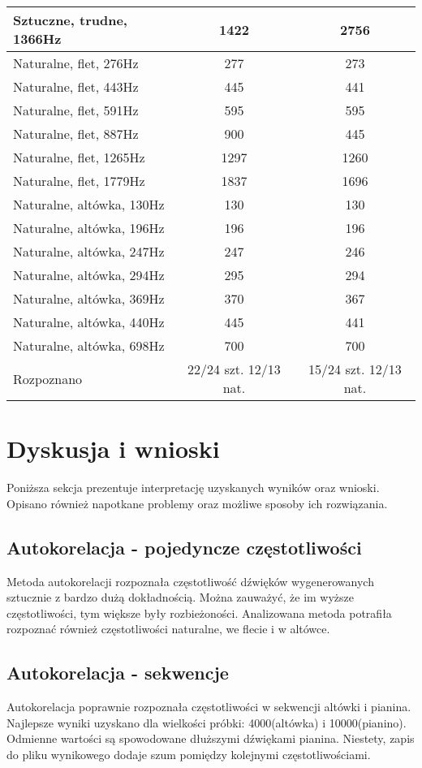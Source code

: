 \documentclass{classrep}
\begin{document}
\begin{tabular}{ l | c | c }
  Sztuczne, trudne, 1366Hz & 1422 & 2756 \\
  \hline 
  Naturalne, flet, 276Hz & 277 & 273 \\
  Naturalne, flet, 443Hz & 445 & 441 \\
  Naturalne, flet, 591Hz & 595 & 595 \\
  Naturalne, flet, 887Hz & 900 & 445 \\
  Naturalne, flet, 1265Hz & 1297 & 1260 \\
  Naturalne, flet, 1779Hz & 1837 & 1696 \\
  \hline 
  Naturalne, altówka, 130Hz & 130 & 130 \\
  Naturalne, altówka, 196Hz & 196 & 196 \\
  Naturalne, altówka, 247Hz & 247 & 246 \\
  Naturalne, altówka, 294Hz & 295 & 294 \\
  Naturalne, altówka, 369Hz & 370 & 367 \\
  Naturalne, altówka, 440Hz & 445 & 441 \\
  Naturalne, altówka, 698Hz & 700 & 700 \\
  \hline 
  Rozpoznano & 22/24 szt. 12/13 nat. & 15/24 szt. 12/13 nat. \\
  \hline 
\end{tabular}

\section{Dyskusja i wnioski}
Poniższa sekcja prezentuje interpretację uzyskanych wyników oraz wnioski. Opisano również napotkane problemy oraz możliwe sposoby ich rozwiązania.

\subsection{Autokorelacja - pojedyncze częstotliwości}
Metoda autokorelacji rozpoznała częstotliwość dźwięków wygenerowanych sztucznie z bardzo dużą dokładnością. Można zauważyć, że im wyższe częstotliwości, tym większe były rozbieżoności. Analizowana metoda potrafiła rozpoznać również częstotliwości naturalne, we flecie i w altówce.

\subsection{Autokorelacja - sekwencje}
Autokorelacja poprawnie rozpoznała częstotliwości w sekwencji altówki i pianina. Najlepsze wyniki uzyskano dla wielkości próbki: 4000(altówka) i 10000(pianino). Odmienne wartości są spowodowane dłuższymi dźwiękami pianina. Niestety, zapis do pliku wynikowego dodaje szum pomiędzy kolejnymi częstotliwościami.
\end{document}
